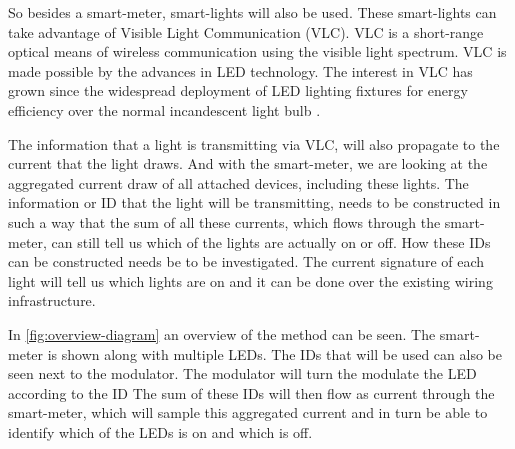 	So besides a smart-meter, smart-lights will also be used.
	These smart-lights can take advantage of Visible Light Communication (VLC).
	VLC is a short-range optical means of wireless communication using the visible light spectrum.
	VLC is made possible by the advances in LED technology.
	The interest in VLC has grown since the widespread deployment of LED lighting fixtures for energy efficiency over the normal incandescent light bulb \cite{rajagopal2012ieee}.


	The information that a light is transmitting via VLC, will also propagate to the current that the light draws.
	And with the smart-meter, we are looking at the aggregated current draw of all attached devices, including these lights.
	The information or ID that the light will be transmitting, needs to be constructed in such a way that the sum of all these currents, which flows through the smart-meter, can still tell us which of the lights are actually on or off.
	How these IDs can be constructed needs be to be investigated.
	The current signature of each light will tell us which lights are on and it can be done over the existing wiring infrastructure.

	In \autoref{fig:overview-diagram} an overview of the method can be seen.
	The smart-meter is shown along with multiple LEDs. %
	The IDs that will be used can also be seen next to the modulator.
	The modulator will turn the modulate the LED according to the ID
	The sum of these IDs will then flow as current through the smart-meter, which will sample this aggregated current and in turn be able to identify which of the LEDs is on and which is off.


